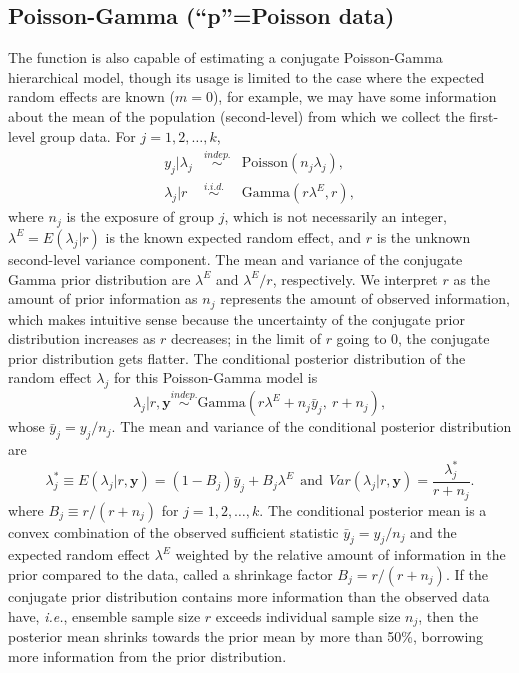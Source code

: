 \documentclass[article]{jss}
\begin{document}
\subsection[Poisson-Gamma]{Poisson-Gamma (``p''=Poisson data)}\label{poissonsubsec}
The function  is also capable of estimating a conjugate Poisson-Gamma hierarchical model, though its usage is limited to the case where the expected random effects are known ($m=0$), for example, we may have some information about the mean of the population (second-level) from which we collect the first-level group data.  For $j=1, 2, \ldots, k$, 
\begin{eqnarray}
y_j\vert \lambda_j &\stackrel{indep.}{\sim} & \textrm{Poisson}(n_{j}\lambda_{j}),\\
\lambda_{j}\vert r &\stackrel{i.i.d.}{\sim}& \textrm{Gamma}(r\lambda^E, r),
\end{eqnarray}
where $n_{j}$ is the exposure of group $j$, which is not necessarily an integer, $\lambda^E=E(\lambda_j\vert r)$ is the known expected random effect, and $r$ is the unknown second-level variance component. The mean and variance of the conjugate Gamma prior distribution are $\lambda^E$ and $\lambda^E/r$, respectively. We interpret $r$ as the amount of prior information as $n_{j}$ represents the amount of observed information, which makes intuitive sense because the uncertainty of the conjugate prior distribution increases as $r$ decreases; in the limit of $r$ going to 0, the conjugate prior distribution gets flatter. The conditional posterior distribution of the random effect $\lambda_j$ for this Poisson-Gamma model is
\begin{equation} \label{gammapost}
\lambda_j\vert r, \boldsymbol{y} \stackrel{indep.}{\sim}\textrm{Gamma}(r\lambda^E + n_j\bar{y}_{j},~ r + n_j),
\end{equation}  
whose $\bar{y}_j=y_j/n_j$. The mean and variance of the conditional posterior distribution are
\begin{equation}\label{gammapost_mean_var}
\lambda^\ast_j\equiv E(\lambda_j\vert r, \boldsymbol{y} )=(1-B_{j})\bar{y}_{j} + B_{j}\lambda^E~~\textrm{and}~~Var(\lambda_j\vert r, \boldsymbol{y})=\frac{\lambda^\ast_j}{r+n_j}.
\end{equation}
where $B_{j}\equiv r / (r+n_{j})$ for $j=1, 2, \ldots, k$.  The conditional posterior mean is  a convex combination of the observed sufficient statistic $\bar{y}_{j} = y_j/n_j$ and the expected random effect  $\lambda^E$ weighted by the relative amount of information in the prior compared to the data, called a shrinkage factor $B_j=r / (r + n_j)$. If the conjugate prior distribution contains more information than the observed data have, \emph{i.e.}, ensemble sample size $r$ exceeds individual sample size $n_{j}$, then the posterior mean shrinks  towards the prior mean by more than 50\%, borrowing more information from the prior distribution. 
\end{document}

